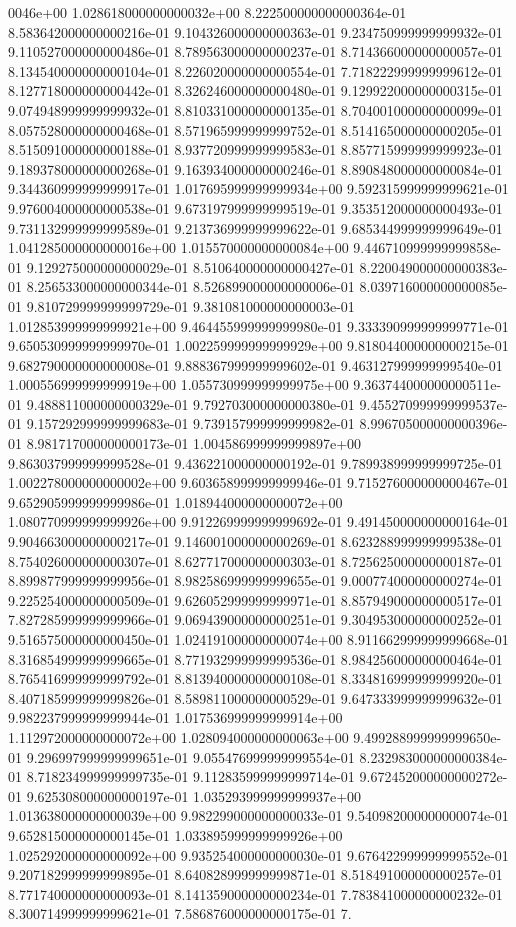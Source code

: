 0046e+00	1.028618000000000032e+00	8.222500000000000364e-01	8.583642000000000216e-01	9.104326000000000363e-01	9.234750999999999932e-01	9.110527000000000486e-01	8.789563000000000237e-01	8.714366000000000057e-01	8.134540000000000104e-01	8.226020000000000554e-01	7.718222999999999612e-01	8.127718000000000442e-01	8.326246000000000480e-01	9.129922000000000315e-01	9.074948999999999932e-01	8.810331000000000135e-01	8.704001000000000099e-01	8.057528000000000468e-01	8.571965999999999752e-01	8.514165000000000205e-01	8.515091000000000188e-01	8.937720999999999583e-01	8.857715999999999923e-01	9.189378000000000268e-01	9.163934000000000246e-01	8.890848000000000084e-01	9.344360999999999917e-01	1.017695999999999934e+00	9.592315999999999621e-01	9.976004000000000538e-01	9.673197999999999519e-01	9.353512000000000493e-01	9.731132999999999589e-01	9.213736999999999622e-01	9.685344999999999649e-01	1.041285000000000016e+00	1.015570000000000084e+00	9.446710999999999858e-01	9.129275000000000029e-01	8.510640000000000427e-01	8.220049000000000383e-01	8.256533000000000344e-01	8.526899000000000006e-01	8.039716000000000085e-01	9.810729999999999729e-01	9.381081000000000003e-01	1.012853999999999921e+00	9.464455999999999980e-01	9.333390999999999771e-01	9.650530999999999970e-01	1.002259999999999929e+00	9.818044000000000215e-01	9.682790000000000008e-01	9.888367999999999602e-01	9.463127999999999540e-01	1.000556999999999919e+00	1.055730999999999975e+00	9.363744000000000511e-01	9.488811000000000329e-01	9.792703000000000380e-01	9.455270999999999537e-01	9.157292999999999683e-01	9.739157999999999982e-01	8.996705000000000396e-01	8.981717000000000173e-01	1.004586999999999897e+00	9.863037999999999528e-01	9.436221000000000192e-01	9.789938999999999725e-01	1.002278000000000002e+00	9.603658999999999946e-01	9.715276000000000467e-01	9.652905999999999986e-01	1.018944000000000072e+00	1.080770999999999926e+00	9.912269999999999692e-01	9.491450000000000164e-01	9.904663000000000217e-01	9.146001000000000269e-01	8.623288999999999538e-01	8.754026000000000307e-01	8.627717000000000303e-01	8.725625000000000187e-01	8.899877999999999956e-01	8.982586999999999655e-01	9.000774000000000274e-01	9.225254000000000509e-01	9.626052999999999971e-01	8.857949000000000517e-01	7.827285999999999966e-01	9.069439000000000251e-01	9.304953000000000252e-01	9.516575000000000450e-01	1.024191000000000074e+00	8.911662999999999668e-01	8.316854999999999665e-01	8.771932999999999536e-01	8.984256000000000464e-01	8.765416999999999792e-01	8.813940000000000108e-01	8.334816999999999920e-01	8.407185999999999826e-01	8.589811000000000529e-01	9.647333999999999632e-01	9.982237999999999944e-01	1.017536999999999914e+00	1.112972000000000072e+00	1.028094000000000063e+00	9.499288999999999650e-01	9.296997999999999651e-01	9.055476999999999554e-01	8.232983000000000384e-01	8.718234999999999735e-01	9.112835999999999714e-01	9.672452000000000272e-01	9.625308000000000197e-01	1.035293999999999937e+00	1.013638000000000039e+00	9.982299000000000033e-01	9.540982000000000074e-01	9.652815000000000145e-01	1.033895999999999926e+00	1.025292000000000092e+00	9.935254000000000030e-01	9.676422999999999552e-01	9.207182999999999895e-01	8.640828999999999871e-01	8.518491000000000257e-01	8.771740000000000093e-01	8.141359000000000234e-01	7.783841000000000232e-01	8.300714999999999621e-01	7.586876000000000175e-01	7.